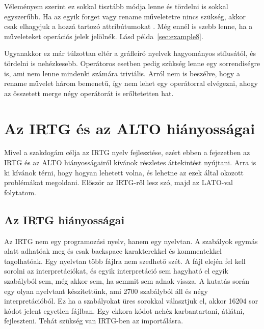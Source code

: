 Véleményem szerint ez sokkal tisztább módja lenne és tördelni is sokkal egyszerűbb. Ha az egyik forget vagy rename műveletetre nincs szükség, akkor csak elhagyjuk a hozzá tartozó attribútumokat . Még ennél is szebb lenne, ha a műveleteket operációs jelek jelölnék. Lásd példa~\ref{sec:example8}.

Ugyanakkor ez már túlzottan eltér a gráfleíró nyelvek hagyományos stílusától, és tördelni is nehézkesebb. Operátoros esetben pedig szükség lenne egy sorrendiségre is, ami nem lenne mindenki számára triviális. Arról nem is beszélve, hogy a rename művelet három bemenetű, így nem lehet egy operátorral elvégezni, ahogy az összetett merge négy operátorát is erőltetetten hat.


\section{Az IRTG és az ALTO hiányosságai}
\label{sec:shortcomming}
Mivel a szakdogám célja az IRTG nyelv fejlesztése, ezért ebben a fejezetben az IRTG és az ALTO hiányosságairól kívánok részletes áttekintést nyújtani.
Arra is ki kívánok térni, hogy hogyan lehetett volna, és lehetne az ezek által okozott problémákat megoldani.
Először az IRTG-ről lesz szó, majd az LATO-val folytatom.

\subsection{Az IRTG hiányosságai}
\label{sec:IRTGshortcomming}

Az IRTG nem egy programozási nyelv, hanem egy nyelvtan. A szabályok egymás alatt adhatóak meg és csak backspace karakterekkel és kommentekkel tagolhatóak. Egy nyelvtan több fájlra nem szedhető szét. A fájl elején fel kell sorolni az interpretációkat, és egyik interpretáció sem hagyható el egyik szabályból sem, még akkor sem, ha semmit sem adnak vissza. A kutatás során egy olyan nyelvtant készítettünk, ami 2700 szabályból áll és négy interpretációból. Ez ha a szabályokat üres sorokkal választjuk el, akkor 16204 sor kódot jelent egyetlen fájlban. Egy ekkora kódot nehéz karbantartani, átlátni, fejleszteni. Tehát szükség van IRTG-ben az importálásra.


